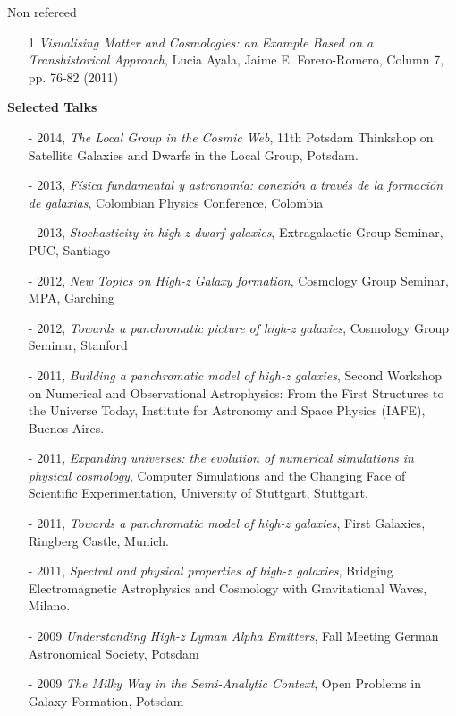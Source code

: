 \documentclass[9pt]{article}
\begin{document}
Non refereed 
\begin{enumerate}
\item[1] {\it Visualising Matter and Cosmologies: an Example Based on
  a Transhistorical Approach}, Lucia Ayala, Jaime E. Forero-Romero,
  Column 7, pp. 76-82 (2011) 
\end{enumerate}


{\bf Selected Talks}
\begin{itemize} 
\item [-] 2014, {\it The Local Group in the Cosmic Web}, 11th Potsdam
  Thinkshop on Satellite Galaxies and Dwarfs in the Local Group,
  Potsdam.
\item [-] 2013, {\it F\'isica fundamental y astronom\'ia: conexi\'on a trav\'es de la formaci\'on de galaxias}, Colombian Physics Conference, Colombia
\item [-] 2013, {\it Stochasticity in high-z dwarf galaxies},
  Extragalactic Group Seminar, PUC, Santiago
\item [-] 2012, {\it New Topics on High-z Galaxy formation}, Cosmology
  Group Seminar, MPA, Garching 
\item [-] 2012, {\it Towards a panchromatic picture of high-z
  galaxies}, Cosmology Group Seminar, Stanford 
\item [-] 2011, {\it Building a panchromatic model of high-z
  galaxies}, Second Workshop on Numerical and Observational
  Astrophysics: From the First Structures to the Universe Today,
  Institute for Astronomy and Space Physics (IAFE), Buenos Aires. 
\item [-] 2011, {\it Expanding universes: the evolution of numerical
  simulations in physical cosmology}, Computer Simulations and the
  Changing Face of Scientific Experimentation, University of
  Stuttgart, Stuttgart. 
\item [-] 2011, {\it Towards a panchromatic model of high-z galaxies}, First
  Galaxies, Ringberg Castle, Munich.  
\item [-] 2011, {\it Spectral and physical properties of high-z galaxies},
  Bridging Electromagnetic Astrophysics and Cosmology with Gravitational
  Waves, Milano.
\item [-] 2009 {\it Understanding High-z Lyman Alpha Emitters}, Fall
  Meeting German Astronomical Society, Potsdam 
\item [-] 2009 {\it The Milky Way in the Semi-Analytic Context}, Open
  Problems in Galaxy Formation, Potsdam 

\end{itemize}
\end{document}
